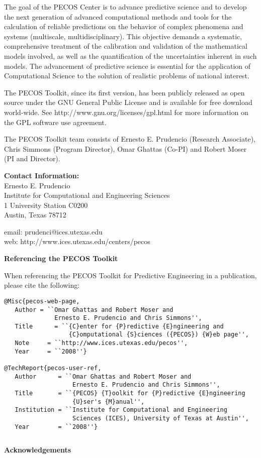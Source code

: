 The goal of the PECOS Center is
to advance predictive science and to develop the next generation of advanced computational methods and tools
for the calculation of reliable predictions on the behavior of complex phenomena and systems (multiscale, multidisciplinary).
This objective demands a systematic, comprehensive treatment of the calibration and validation of the mathematical models involved,
as well as the quantification of the uncertainties inherent in such models.
The advancement of predictive science is essential for the application of Computational Science to the solution of realistic problems of national interest.

The PECOS Toolkit, since its first version, has been publicly released as open source
under the GNU General Public License and is available for free download world-wide.
See http://www.gnu.org/licenses/gpl.html for more information on the GPL software use agreement.

The PECOS Toolkit team consists of
Ernesto E. Prudencio (Research Associate),
Chris Simmons (Program Director),
Omar Ghattas (Co-PI) and
Robert Moser (PI and Director).

{\bf Contact Information:}\\
Ernesto E. Prudencio\\
Institute for Computational and Engineering Sciences\\
1 University Station C0200\\
Austin, Texas 78712

email: prudenci@ices.utexas.edu\\
web: http://www.ices.utexas.edu/centers/pecos\\
$~$\\

\centerline{\bf Referencing the PECOS Toolkit}

When referencing the PECOS Toolkit for Predictive Engineering in a publication, please cite the following:
\begin{verbatim}
@Misc{pecos-web-page,
   Author = ``Omar Ghattas and Robert Moser and
              Ernesto E. Prudencio and Chris Simmons'',
   Title      = ``{C}enter for {P}redictive {E}ngineering and
                  {C}omputational {S}ciences ({PECOS}) {W}eb page'',
   Note     = ``http://www.ices.utexas.edu/pecos'',
   Year     = ``2008''}

@TechReport{pecos-user-ref,
   Author      = ``Omar Ghattas and Robert Moser and
                   Ernesto E. Prudencio and Chris Simmons'',
   Title       = ``{PECOS} {T}oolkit for {P}redictive {E}ngineering
                   {U}ser's {M}anual'',
   Institution = ``Institute for Computational and Engineering
                   Sciences (ICES), University of Texas at Austin'',
   Year        = ``2008''}
\end{verbatim}
$~$\\
$~$\\

\centerline{\bf Acknowledgements}

